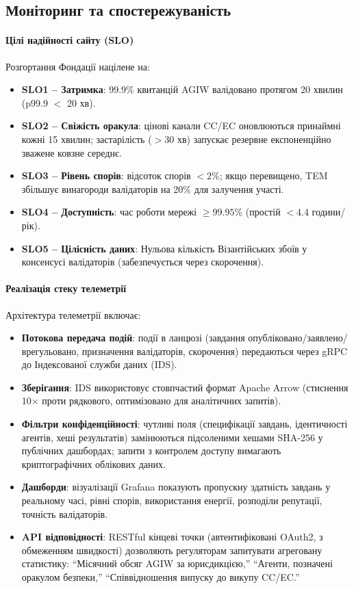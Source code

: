 \documentclass[11pt]{article}
\begin{document}
\subsection{Моніторинг та спостережуваність}
\paragraph{Цілі надійності сайту (SLO)} Розгортання Фондації націлене на:
\begin{itemize}[noitemsep]
  \item \textbf{SLO1 -- Затримка}: 99.9\% квитанцій AGIW валідовано протягом 20 хвилин (p99.9 $<$ 20 хв).
  \item \textbf{SLO2 -- Свіжість оракула}: цінові канали CC/EC оновлюються принаймні кожні 15 хвилин; застарілість ($>30$ хв) запускає резервне експоненційно зважене ковзне середнє.
  \item \textbf{SLO3 -- Рівень спорів}: відсоток спорів $<2\%$; якщо перевищено, TEM збільшує винагороди валідаторів на 20\% для залучення участі.
  \item \textbf{SLO4 -- Доступність}: час роботи мережі $\geq 99.95\%$ (простій $<4.4$ години/рік).
  \item \textbf{SLO5 -- Цілісність даних}: Нульова кількість Візантійських збоїв у консенсусі валідаторів (забезпечується через скорочення).
\end{itemize}

\paragraph{Реалізація стеку телеметрії} Архітектура телеметрії включає:
\begin{itemize}[noitemsep]
  \item \textbf{Потокова передача подій}: події в ланцюзі (завдання опубліковано/заявлено/врегульовано, призначення валідаторів, скорочення) передаються через gRPC до Індексованої служби даних (IDS).
  \item \textbf{Зберігання}: IDS використовує стовпчастий формат Apache Arrow (стиснення 10$\times$ проти рядкового, оптимізовано для аналітичних запитів).
  \item \textbf{Фільтри конфіденційності}: чутливі поля (специфікації завдань, ідентичності агентів, хеші результатів) замінюються підсоленими хешами SHA-256 у публічних дашбордах; запити з контролем доступу вимагають криптографічних облікових даних.
  \item \textbf{Дашборди}: візуалізації Grafana показують пропускну здатність завдань у реальному часі, рівні спорів, використання енергії, розподіли репутації, точність валідаторів.
  \item \textbf{API відповідності}: RESTful кінцеві точки (автентифіковані OAuth2, з обмеженням швидкості) дозволяють регуляторам запитувати агреговану статистику: ``Місячний обсяг AGIW за юрисдикцією,'' ``Агенти, позначені оракулом безпеки,'' ``Співвідношення випуску до викупу CC/EC.''
\end{itemize}
\end{document}
